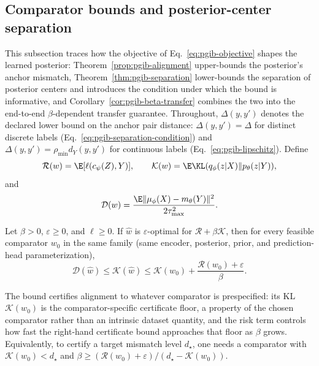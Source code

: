 \subsection{Comparator bounds and posterior-center separation}
\label{sec:guarantees}
This subsection traces how the objective of Eq.~\eqref{eq:pgib-objective} shapes
the learned posterior: Theorem~\ref{prop:pgib-alignment} upper-bounds the
posterior's anchor mismatch, Theorem~\ref{thm:pgib-separation} lower-bounds the
separation of posterior centers and introduces the condition under which the bound
is informative, and Corollary~\ref{cor:pgib-beta-transfer} combines the two into
the end-to-end $\beta$-dependent transfer guarantee. Throughout, $\Delta(y,y')$
denotes the declared lower bound on the anchor pair distance:
$\Delta(y,y')=\Delta$ for distinct discrete labels
(Eq.~\eqref{eq:pgib-separation-condition}) and
$\Delta(y,y')=\rho_{\min}d_Y(y,y')$ for continuous labels
(Eq.~\eqref{eq:pgib-lipschitz}). Define
\begin{equation}
\mathcal R(w)=\E[\ell(c_\psi(Z),Y)],\qquad
\mathcal K(w)=\E\KL(q_\phi(z|X)\|p_\theta(z|Y)),
\label{eq:risk-rate-definitions}
\end{equation}
and
\begin{equation}
\mathcal D(w)=\frac{\E\|\mu_\phi(X)-m_\theta(Y)\|^2}{2\tau_{\max}^2}.
\label{eq:expected-anchor-mismatch}
\end{equation}
\begin{theorem}
\label{prop:pgib-alignment}
Let $\beta>0$, $\varepsilon\ge0$, and $\ell\ge0$. If $\widehat w$ is
$\varepsilon$-optimal for $\mathcal R+\beta\mathcal K$, then for every feasible
comparator $w_0$ in the same family (same encoder, posterior, prior, and
prediction-head parameterization),
\begin{equation}
\mathcal D(\widehat w)\le\mathcal K(\widehat w)\le
\mathcal K(w_0)+\frac{\mathcal R(w_0)+\varepsilon}{\beta}.
\label{eq:pgib-comparator-bound}
\end{equation}
\end{theorem}

The bound certifies alignment to whatever comparator is prespecified: its KL
$\mathcal K(w_0)$ is the comparator-specific certificate floor, a property of
the chosen comparator rather than an intrinsic dataset quantity, and the risk
term controls how fast the right-hand certificate bound approaches that floor
as $\beta$ grows. Equivalently, to certify a target mismatch level $d_\star$,
one needs a comparator with $\mathcal K(w_0)<d_\star$ and
$\beta\ge(\mathcal R(w_0)+\varepsilon)/(d_\star-\mathcal K(w_0))$.

